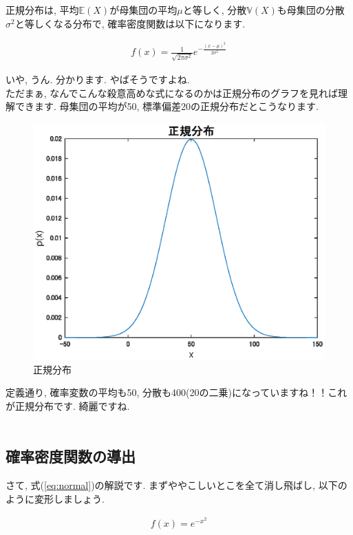 \documentclass[11pt,a4paper]{ujreport} 	%
\begin{document}
正規分布は, 平均$\mathbb{E}(X)$が母集団の平均$μ$と等しく, 分散$\mathbb{V}(X)$も母集団の分散$\sigma ^2$と等しくなる分布で, 確率密度関数は以下になります.

\begin{align}
\label{eq:normal}
f(x) = \frac{1}{\sqrt{2\pi\sigma^2}}e^{-\frac{(x-\mu)^2}{2\sigma^2}}
\end{align}

いや, うん. 分かります. やばそうですよね. \\

ただまぁ, なんでこんな殺意高めな式になるのかは正規分布のグラフを見れば理解できます. 母集団の平均が50, 標準偏差20の正規分布だとこうなります.

\begin{figure}[H]
\label{im:normal}
  \centering
  \includegraphics[width=120mm]{../figures/normal.eps}
  \caption{正規分布}
\end{figure}

定義通り, 確率変数の平均も50, 分散も400(20の二乗)になっていますね！！これが正規分布です. 綺麗ですね.\\
\\
\subsection{確率密度関数の導出}
さて, 式(\ref{eq:normal})の解説です. まずややこしいとこを全て消し飛ばし, 以下のように変形しましょう. 

\begin{align}
\label{eq:normal2}
f(x) = e^{-x^2}
\end{align}
\end{document}
